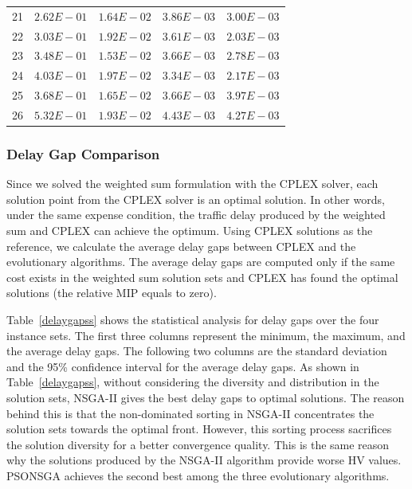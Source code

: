 \documentclass[10pt,journal,compsoc]{IEEEtran}
\begin{document}
\begin{table}[ht]
\begin{scriptsize}
{\begin{tabular}{|*{5}{c|}}
21&$2.62E-01$&$1.64E-02$&$3.86E-03$&\cellcolor{gray95}$3.00E-03$\\
22&$3.03E-01$&$1.92E-02$&$3.61E-03$&\cellcolor{gray95}$2.03E-03$\\
23&$3.48E-01$&$1.53E-02$&$3.66E-03$&\cellcolor{gray95}$2.78E-03$\\
24&$4.03E-01$&$1.97E-02$&$3.34E-03$&\cellcolor{gray95}$2.17E-03$\\
25&$3.68E-01$&$1.65E-02$&\cellcolor{gray95}$3.66E-03$&$3.97E-03$\\
26&$5.32E-01$&$1.93E-02$&$4.43E-03$&\cellcolor{gray95}$4.27E-03$\\\hline
\end{tabular}}
\end{scriptsize}
\end{table}


\subsubsection{Delay Gap Comparison}
Since we solved the weighted sum formulation with the CPLEX solver, each solution point from the CPLEX solver is an optimal solution. In other words, under the same expense condition, the traffic delay produced by the weighted sum and CPLEX can achieve the optimum. Using CPLEX solutions as the reference, we calculate the average delay gaps between CPLEX and the evolutionary algorithms. The average delay gaps are computed only if the same cost exists in the weighted sum solution sets and CPLEX has found the optimal solutions (the relative MIP equals to zero). 

Table~\ref{delaygapss} shows the statistical analysis for delay gaps over the four instance sets. The first three columns represent the minimum, the maximum, and the average delay gaps. The following two columns are the standard deviation and the 95\% confidence interval for the average delay gaps. As shown in Table~\ref{delaygapss}, without considering the diversity and distribution in the solution sets, NSGA-II gives the best delay gaps to optimal solutions. The reason behind this is that the non-dominated sorting in NSGA-II concentrates the solution sets towards the optimal front. However, this sorting process sacrifices the solution diversity for a better convergence quality. This is the same reason why the solutions produced by the NSGA-II algorithm provide worse HV values. PSONSGA achieves the second best among the three evolutionary algorithms.
\end{document}
